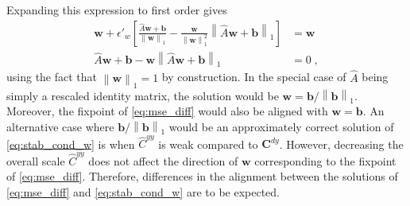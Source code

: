 \documentclass[10pt,a4paper]{article}
\begin{document}
Expanding this expression to first order gives
\begin{align}
	\mathbf{w} + \epsilon'_w \left[\frac{\widehat{A}\mathbf{w} + \mathbf{b}}{\left\lVert \mathbf{w} \right\rVert_1} - \frac{\mathbf{w}}{\left\lVert \mathbf{w} \right\rVert_1^2}\left\lVert \widehat{A}\mathbf{w} + \mathbf{b}\right\rVert_1\right] &= \mathbf{w} \\
	\widehat{A}\mathbf{w} + \mathbf{b} - \mathbf{w}\left\lVert \widehat{A}\mathbf{w} + \mathbf{b}\right\rVert_1 &= 0 \; ,
\end{align}
using the fact that $\left\lVert \mathbf{w} \right\rVert_1 = 1$ by construction. In the special case of $\widehat{A}$ being simply a rescaled identity matrix, the solution would be $\mathbf{w} = \mathbf{b} / \left\lVert \mathbf{b} \right\rVert_1$. Moreover, the fixpoint of \eqref{eq:mse_diff} would also be aligned with $\mathbf{w} = \mathbf{b}$. An alternative case where $\mathbf{b} / \left\lVert \mathbf{b} \right\rVert_1$ would be an approximately correct solution of \eqref{eq:stab_cond_w} is when $\widehat{C}^{yy}$ is weak compared to $\mathbf{C}^{dy}$. However, decreasing the overall scale $\widehat{C}^{yy}$ does not affect the direction of $\mathbf{w}$ corresponding to the fixpoint of \eqref{eq:mse_diff}. Therefore, differences in the alignment between the solutions of \eqref{eq:mse_diff} and \eqref{eq:stab_cond_w} are to be expected.
\end{document}
